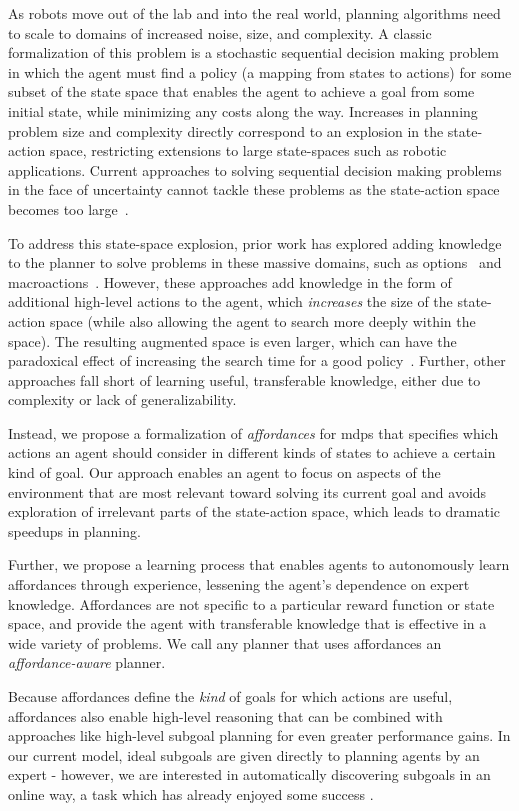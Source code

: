 \documentclass[letterpaper]{article}
\begin{document}
As robots move out of the lab and into the real world, planning
algorithms need to scale to domains of increased noise, size, and
complexity.  A classic formalization of this problem is a stochastic
sequential decision making problem in which the agent must find a
policy (a mapping from states to actions) for some subset of the state
space that enables the agent to achieve a goal from some initial
state, while minimizing any costs along the way.
Increases in planning problem size and complexity directly correspond
to an explosion in the state-action space, restricting extensions to large state-spaces
such as robotic applications. Current approaches to solving 
sequential decision making problems in the face of uncertainty cannot tackle these problems 
as the state-action space becomes too large~\cite{grounds05}.

To address this state-space explosion, prior work has explored adding
knowledge to the planner to solve problems in these
massive domains, such as options~\cite{sutton99} and
macroactions~\cite{Botea:2005kx,Newton:2005vn}. However, these
approaches add knowledge in the form of additional high-level actions
to the agent, which {\em increases} the size of the state-action space
(while also allowing the agent to search more deeply within the
space).  The resulting augmented space is even larger, which can have
the paradoxical effect of increasing the search time for a good
policy~\cite{Jong:2008zr}. Further, other approaches fall short of learning useful, transferable knowledge,
either due to complexity or lack of generalizability.

Instead, we propose a formalization of {\em affordances} \cite{gibson77} for \glspl{mdp} that
specifies which actions an agent should consider in different kinds of states to achieve a certain kind of goal.
Our approach enables an agent to focus on
aspects of the environment that are most relevant toward solving its current goal 
and avoids exploration of irrelevant parts of the 
state-action space, which leads to dramatic speedups in planning.

Further, we propose a learning process that enables agents to
autonomously learn affordances through experience, lessening the
agent's dependence on expert knowledge. Affordances are not specific
to a particular reward function or state space, and provide the agent
with transferable knowledge that is effective in a wide variety of
problems. We call any planner that uses affordances an {\it
  affordance-aware} planner.


Because affordances define the {\em kind} of goals for which actions
are useful, affordances also enable high-level reasoning that can be
combined with approaches like high-level subgoal planning for even
greater performance gains. In our current model, ideal subgoals are
given directly to planning agents by an expert - however, we are
interested in automatically discovering subgoals in an online way, a
task which has already enjoyed some success
\cite{Mcgovern01automaticdiscovery,Simsek:2005:IUS:1102351.1102454}.
\end{document}
